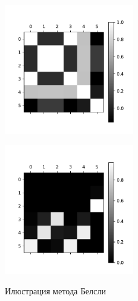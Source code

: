 \begin{figure}[h!t]\center
\begin{minipage}[t]{.5\textwidth}
{\includegraphics[width=0.5\textwidth]{plots/grabovoy/Cov.pdf}}
\end{minipage}
\begin{minipage}[t]{.5\textwidth}
{\includegraphics[width=0.5\textwidth]{plots/grabovoy/BelslyImage.pdf}}
\end{minipage}
\caption{Илюстрация метода Белсли}
\label{CovBel}
\end{figure}

